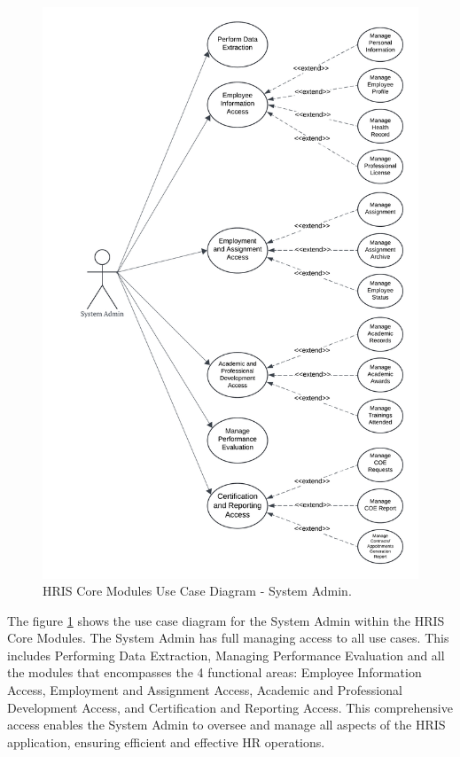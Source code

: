    \begin{figure}[H]
        \centering
        \includegraphics[width=0.9\linewidth]{figures/images/diagrams/usecase/use-case-basic-1.png}
        \caption{HRIS Core Modules Use Case Diagram - System Admin.}
        \label{fig:use-case-basic-1}
    \end{figure}

    The figure \ref{fig:use-case-basic-1} shows the use case diagram for the System Admin within the HRIS Core Modules. The System Admin has full managing access to all use cases. This includes Performing Data Extraction, Managing Performance Evaluation and all the modules that encompasses the 4 functional areas: Employee Information Access, Employment and Assignment Access, Academic and Professional Development Access, and Certification and Reporting Access. This comprehensive access enables the System Admin to oversee and manage all aspects of the HRIS application, ensuring efficient and effective HR operations.

